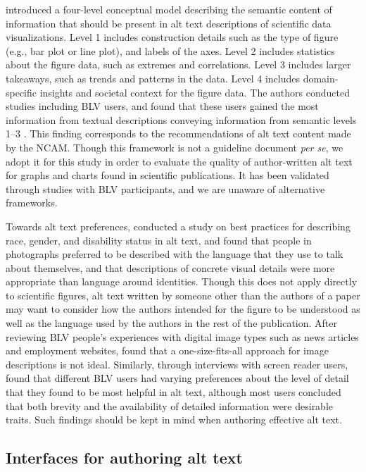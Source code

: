 \documentclass[sigconf]{acmart}
\begin{document}
\citet{Lundgard2022AccessibleVV} introduced a four-level conceptual model describing the semantic content of information that should be present in alt text descriptions of scientific data visualizations. Level 1 includes construction details such as the type of figure (e.g., bar plot or line plot), and labels of the axes. Level 2 includes statistics about the figure data, such as extremes and correlations. Level 3 includes larger takeaways, such as trends and patterns in the data. Level 4 includes domain-specific insights and societal context for the figure data. The authors conducted studies including BLV users, and found that these users gained the most information from textual descriptions conveying information from semantic levels 1--3 \citep{Lundgard2022AccessibleVV}. This finding corresponds to the recommendations of alt text content made by the NCAM. Though this framework is not a guideline document \emph{per se}, we adopt it for this study in order to evaluate the quality of author-written alt text for graphs and charts found in scientific publications. It has been validated through studies with BLV participants, and we are unaware of alternative frameworks.

Towards alt text preferences, \citet{bennett-chi21} 
conducted a study on best practices for describing race, gender, and disability status in alt text, and found that people in photographs preferred to be described with the language that they use to talk about themselves, and that descriptions of concrete visual details were more appropriate than language around identities. Though this does not apply directly to scientific figures, alt text written by someone other than the authors of a paper may want to consider how the authors intended for the figure to be understood as well as the language used by the authors in the rest of the publication.
After reviewing BLV people's experiences with digital image types such as news articles and employment websites, \citet{stangl-what-want} found that a one-size-fits-all approach for image descriptions is not ideal. Similarly, through interviews with screen reader users, \citet{Mack2021DesigningTF} found that different BLV users had varying preferences about the level of detail that they found to be most helpful in alt text, although most users concluded that both brevity and the availability of detailed information were desirable traits. Such findings should be kept in mind when authoring effective alt text. 



\subsection{Interfaces for authoring alt text}
\label{sec:interfaces}
\end{document}
